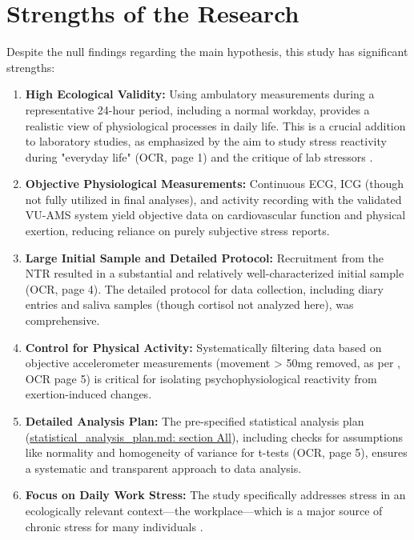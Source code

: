 \documentclass[11pt, a4paper]{report}
\newcommand{\mdcitesec}[2]{\href{run:./sources/#1}{\url{#1}: section #2}}
\begin{document}
\section{Strengths of the Research}
\label{sec:discussion_strengths}

Despite the null findings regarding the main hypothesis, this study has significant strengths:

\begin{enumerate}
    \item \textbf{High Ecological Validity:} Using ambulatory measurements during a representative 24-hour period, including a normal workday, provides a realistic view of physiological processes in daily life. This is a crucial addition to laboratory studies, as emphasized by the aim to study stress reactivity during "everyday life" \cite{ThesisTempPDF} (OCR, page 1) and the critique of lab stressors \cite{deGeusGevonden2024}.
    \item \textbf{Objective Physiological Measurements:} Continuous ECG, ICG (though not fully utilized in final analyses), and activity recording with the validated VU-AMS system yield objective data on cardiovascular function and physical exertion, reducing reliance on purely subjective stress reports.
    \item \textbf{Large Initial Sample and Detailed Protocol:} Recruitment from the NTR resulted in a substantial and relatively well-characterized initial sample \cite{ThesisTempPDF} (OCR, page 4). The detailed protocol for data collection, including diary entries and saliva samples (though cortisol not analyzed here), was comprehensive.
    \item \textbf{Control for Physical Activity:} Systematically filtering data based on objective accelerometer measurements (movement > 50mg removed, as per \cite{ThesisTempPDF}, OCR page 5) is critical for isolating psychophysiological reactivity from exertion-induced changes.
    \item \textbf{Detailed Analysis Plan:} The pre-specified statistical analysis plan (\mdcitesec{statistical_analysis_plan.md}{All}), including checks for assumptions like normality and homogeneity of variance for t-tests \cite{ThesisTempPDF} (OCR, page 5), ensures a systematic and transparent approach to data analysis.
    \item \textbf{Focus on Daily Work Stress:} The study specifically addresses stress in an ecologically relevant context—the workplace—which is a major source of chronic stress for many individuals \cite{Spector2002}.
\end{enumerate}
\end{document}
